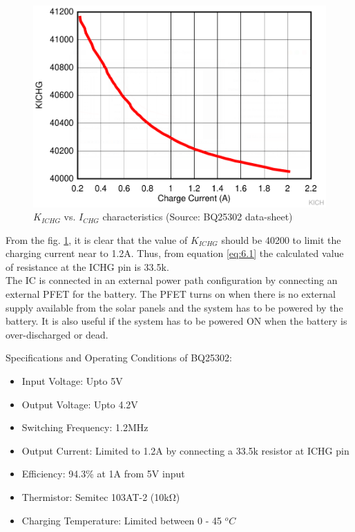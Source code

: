   \begin{center}
 	\begin{figure}[h]
 		\centering
 		\includegraphics[width=\columnwidth]{kich.png}
 		\caption[$K_{ICHG}$ vs. $I_{CHG}$ characteristics]{\centering $K_{ICHG}$ vs. $I_{CHG}$ characteristics (Source: BQ25302 data-sheet)}
 		\label{fig:kichg}
 	\end{figure}
 \end{center}
 From the fig. \ref{fig:kichg}, it is clear that the value of $K_{ICHG}$ should be 40200 to limit the charging current near to 1.2A. Thus, from equation \ref{eq:6.1} the calculated value of resistance at the ICHG pin is 33.5k\ohm.
 \\
 
 The IC is connected in an external power path configuration by connecting an external PFET for the battery. The PFET turns on when there is no external supply available from the solar panels and the system has to be powered by the battery. It is also useful if the system has to be powered ON when the battery is over-discharged or dead. 
 
 
 Specifications and Operating Conditions of BQ25302:
\begin{itemize}
 	\item Input Voltage: Upto 5V
 	\item Output Voltage: Upto 4.2V
 	\item Switching Frequency: 1.2MHz
 	\item Output Current: Limited to 1.2A by connecting a 33.5k resistor at ICHG pin 
 	\item Efficiency: 94.3\% at 1A from 5V input 
 	\item Thermistor: Semitec 103AT-2 (10\si{\kilo\ohm})
 	\item Charging Temperature: Limited between 0 - 45 $^{o}C$
 \end{itemize}

